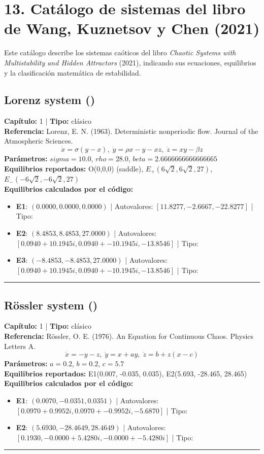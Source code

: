 
\section{13. Catálogo de sistemas del libro de Wang, Kuznetsov y Chen (2021)}

Este catálogo describe los sistemas caóticos del libro \emph{Chaotic Systems with Multistability and Hidden Attractors} (2021), indicando sus ecuaciones, equilibrios y la clasificación matemática de estabilidad.

\subsection*{Lorenz system ()}
\textbf{Capítulo:} 1 | \textbf{Tipo:} clásico\\
\textbf{Referencia:} Lorenz, E. N. (1963). Deterministic nonperiodic flow. Journal of the Atmospheric Sciences.\\
\[\dot{x}=\sigma(y-x), \; \dot{y}=\rho x-y-xz, \; \dot{z}=xy-\beta z\]
\textbf{Parámetros:} $sigma = 10.0$, $rho = 28.0$, $beta = 2.6666666666666665$\\
\textbf{Equilibrios reportados:} O(0,0,0) (saddle), $E_+(6\sqrt{2}, 6\sqrt{2}, 27)$, $E_-(-6\sqrt{2}, -6\sqrt{2}, 27)$\\
\textbf{Equilibrios calculados por el código:}
\begin{itemize}
  \item \textbf{E1}: $(0.0000, 0.0000, 0.0000)$ | Autovalores: $[11.8277, -2.6667, -22.8277]$ | Tipo: 
  \item \textbf{E2}: $(8.4853, 8.4853, 27.0000)$ | Autovalores: $[0.0940 + 10.1945i, 0.0940 + -10.1945i, -13.8546]$ | Tipo: 
  \item \textbf{E3}: $(-8.4853, -8.4853, 27.0000)$ | Autovalores: $[0.0940 + 10.1945i, 0.0940 + -10.1945i, -13.8546]$ | Tipo: 
\end{itemize}
\hrule

\subsection*{Rössler system ()}
\textbf{Capítulo:} 1 | \textbf{Tipo:} clásico\\
\textbf{Referencia:} Rössler, O. E. (1976). An Equation for Continuous Chaos. Physics Letters A.\\
\[\dot{x}=-y-z, \; \dot{y}=x+ay, \; \dot{z}=b+z(x-c)\]
\textbf{Parámetros:} $a = 0.2$, $b = 0.2$, $c = 5.7$\\
\textbf{Equilibrios reportados:} E1(0.007, -0.035, 0.035), E2(5.693, -28.465, 28.465)\\
\textbf{Equilibrios calculados por el código:}
\begin{itemize}
  \item \textbf{E1}: $(0.0070, -0.0351, 0.0351)$ | Autovalores: $[0.0970 + 0.9952i, 0.0970 + -0.9952i, -5.6870]$ | Tipo: 
  \item \textbf{E2}: $(5.6930, -28.4649, 28.4649)$ | Autovalores: $[0.1930, -0.0000 + 5.4280i, -0.0000 + -5.4280i]$ | Tipo: 
\end{itemize}
\hrule

